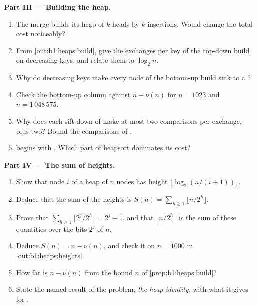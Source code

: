 \begin{problem}
\medskip\noindent\textbf{Part III --- Building the heap.}
\begin{enumerate}[resume]
\item The merge builds its heap of $k$ heads by $k$ insertions. Would  change the total cost noticeably?
\item From \cref{out:b1:heaps:build}, give the exchanges per key of the top-down build on decreasing keys, and relate
them to $\log_2 n$.
\item Why do decreasing keys make every node of the bottom-up build sink to a ?
\item Check the bottom-up column against $n - \nu(n)$ for $n = 1023$ and $n = 1\,048\,575$.
\item Why does each sift-down of  make at most two comparisons per exchange, plus two? Bound the comparisons of
.
\item {} begins with . Which part of heapsort dominates its cost?
\end{enumerate}

\medskip\noindent\textbf{Part IV --- The sum of heights.}
\begin{enumerate}[resume]
\item Show that node $i$ of a heap of $n$ nodes has height $\lfloor \log_2 (n/(i + 1)) \rfloor$.
\item Deduce that the sum of the heights is $S(n) = \sum_{h \geq 1} \lfloor n/2^h \rfloor$.
\item Prove that $\sum_{h \geq 1} \lfloor 2^j/2^h \rfloor = 2^j - 1$, and that $\lfloor n/2^h \rfloor$ is the sum of these
quantities over the bits $2^j$ of $n$.
\item Deduce $S(n) = n - \nu(n)$, and check it on $n = 1000$ in \cref{out:b1:heaps:heights}.
\item How far is $n - \nu(n)$ from the bound $n$ of \cref{prop:b1:heaps:build}?
\item State the named result of the problem, \emph{the heap identity}, with what it gives for .
\end{enumerate}
\end{problem}
